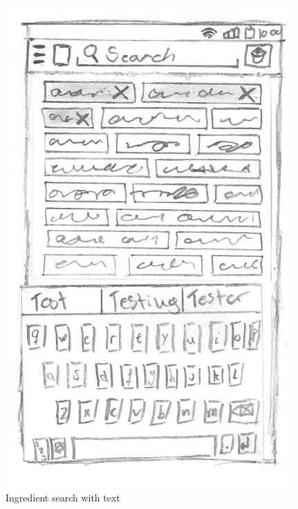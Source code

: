 \begin{figure}[H]
\begin{minipage}[b]{0.5\columnwidth}
\includegraphics[width=0.7\columnwidth]{img/prototypes/ingredient_search_text.pdf}
\caption{Ingredient search with text\label{fig:ingretext}}
\end{minipage}
\end{figure}

